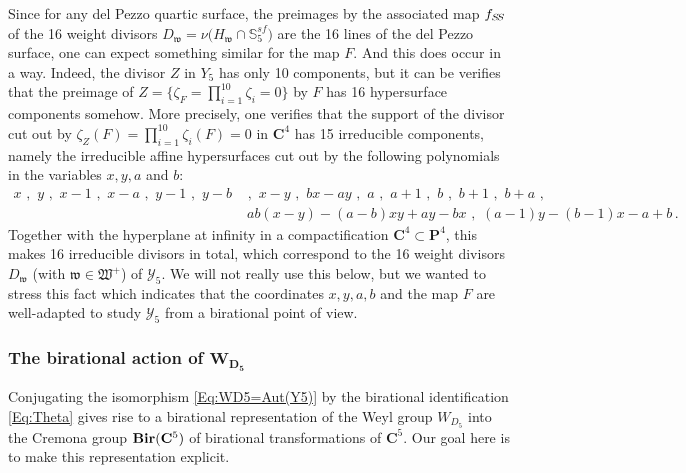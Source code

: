 \documentclass[11pt]{amsart}
\newcommand{\sk}{\smallskip}
\begin{document}
Since for any del Pezzo quartic surface, the preimages by the associated map $f_{S\hspace{-0.05cm}S}$ of the 16 weight divisors $D_{\mathfrak w}=\nu\big( H_{\mathfrak w} \cap \mathbb S_5^{sf}\big)$ are the 16 lines of the del Pezzo surface, one can expect something similar for the map $F$.  And this does occur in a way. Indeed, the divisor $Z$ in $Y_5$  has only 10 components, but it can be verifies that the preimage of $Z=\{ 
\zeta_F=\prod_{i=1}^{10} \zeta_i=0\}$ by $F$ has 16 hypersurface components somehow. More precisely,  one verifies that the support of the divisor cut out  by 
$\zeta_Z(F)=\prod_{i=1}^{10}\zeta_i(F)=0$  in $\mathbf C^4$  has 15 irreducible components, namely the irreducible affine hypersurfaces cut out by the following polynomials in the variables $x,y,a$ and $b$:
\begin{align*}
x  \,\, , \,\,
   y
     \,\, , \,\,
      x-1  \,\, , \,\,
 x-a
  \,\, , \,\, 
 y-1   
  \,\, , \,\,
 y-b
 &
  \,\, , \,\,
 x-y 
  \,\, , \,\, 
 b x- a y
  \,\, , \,\, 
 a
   \,\, , \,\,
 a +1
   \,\, , \,\,
b  \,\, , \,\, 
b +1  \,\, , \,\, b +a   \,\, , 
  \\
  &\; 
ab (x - y)  -(a-b) xy +a y -b x
  \,\, , \,\,
(a-1) y -(b-1) x -a +b  
     \, .
\end{align*}
Together with the hyperplane at infinity in a compactification $\mathbf C^4\subset \mathbf P^4$, this makes 16 irreducible divisors in total, which correspond to the 16 weight divisors $D_{\mathfrak{w}}$ (with $\mathfrak w\in \mathfrak W^+$) of $\boldsymbol{\mathcal Y}_5$. We will not really use this below, but we wanted to stress this fact which indicates that  the coordinates $x,y,a,b$ and the map $F$  are well-adapted to study $\boldsymbol{\mathcal Y}_5$ from a birational point of view. 









\subsubsection{\bf The birational action of $\boldsymbol{W_{D_5}}$}
\label{SS:Birational-action-w(D5)}
Conjugating the isomorphism \eqref{Eq:WD5=Aut(Y5)}
by the birational identification \eqref{Eq:Theta} gives rise to a birational representation 
of the Weyl group $W_{D_5}$ into the Cremona group ${\bf Bir}(\mathbf C^5)$ of birational transformations of $\mathbf C^5$. Our goal here is to make this representation explicit.
\sk 
\end{document}

